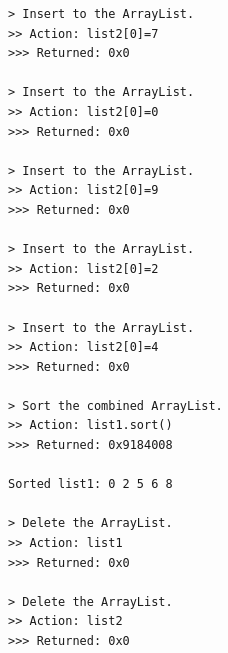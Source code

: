 \documentclass[a4paper]{article}
\begin{document}
\begin{CJK*}{UTF8}{gbsn}
\begin{verbatim}
> Insert to the ArrayList.
>> Action: list2[0]=7
>>> Returned: 0x0

> Insert to the ArrayList.
>> Action: list2[0]=0
>>> Returned: 0x0

> Insert to the ArrayList.
>> Action: list2[0]=9
>>> Returned: 0x0

> Insert to the ArrayList.
>> Action: list2[0]=2
>>> Returned: 0x0

> Insert to the ArrayList.
>> Action: list2[0]=4
>>> Returned: 0x0

> Sort the combined ArrayList.
>> Action: list1.sort()
>>> Returned: 0x9184008

Sorted list1: 0 2 5 6 8

> Delete the ArrayList.
>> Action: list1
>>> Returned: 0x0

> Delete the ArrayList.
>> Action: list2
>>> Returned: 0x0
    \end{verbatim}

\clearpage
\end{CJK*}
\end{document}
